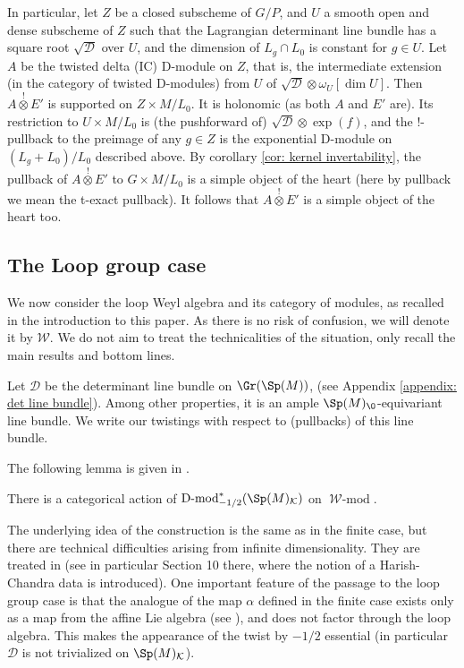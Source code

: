 \documentclass[11pt]{article}
\begin{document}
In particular, let $Z$ be a closed subscheme of $G/P$, and $U$ a smooth open and dense subscheme of $Z$ such that the Lagrangian determinant line bundle has a square root $\sqrt{\mathcal{D}}$ over $U$, and the dimension of $L_g\cap L_0$ is constant for $g\in U$. Let $A$ be the twisted delta (IC) D-module on $Z$, that is, the intermediate extension (in the category of twisted D-modules) from $U$ of $\sqrt{\mathcal{D}}\otimes \omega_U[\dim U]$.
Then $A\stackrel{!}{\otimes} E'$ is supported on $Z\times M/L_0$. It is holonomic (as both $A$ and $E'$ are). Its restriction to $U\times M/L_0$ is (the pushforward of) $\sqrt{\mathcal{D}}\otimes \exp(f)$, and the !-pullback to the preimage of any $g\in Z$ is the exponential D-module on $(L_g + L_0) / L_0$ described above. By corollary \ref{cor: kernel invertability}, the pullback of $A\stackrel{!}{\otimes}E'$ to $G\times M/L_0$ is a simple object of the heart (here by pullback we mean the t-exact pullback). It follows that $A\stackrel{!}{\otimes}E'$ is a simple object of the heart too.

\subsection{The Loop group case}
We now consider the loop Weyl algebra and its category of modules, as recalled in the introduction to this paper. As there is no risk of confusion, we will denote it by $\mathcal{W}$.
We do not aim to treat the technicalities of the situation, only recall the main results and bottom lines.

Let $\mathcal{D}$ be the determinant line bundle on $\Gr(\Sp(M))$, (see Appendix \ref{appendix: det line bundle}). Among other properties, it is an ample $\Sp(M)_\O$-equivariant line bundle.
We write our twistings with respect to (pullbacks) of this line bundle.

The following lemma is given in \cite[Lemma 2.4.1]{BDFRT}.
\begin{lemma}\label{lemma: Weil rep}
    There is a categorical action of $\operatorname{D-mod}_{-1/2}^*(\Sp(M)_\mathcal{K})$ on $\operatorname{\mathcal{W}-\mathrm{mod}}$.
\end{lemma}
The underlying idea of the construction is the same as in the finite case, but there are technical difficulties arising from infinite dimensionality. They are treated in \cite{Ras2} (see in particular Section 10 there, where the notion of a Harish-Chandra data is introduced).
One important feature of the passage to the loop group case is that the analogue of the map $\alpha$ defined in the finite case exists only as a map from the affine Lie algebra (see \cite{FF}), and does not factor through the loop algebra. This makes the appearance of the twist by $-1/2$ essential (in particular $\mathcal{D}$ is not trivialized on $\Sp(M)_\mathcal{K}$).
\end{document}
